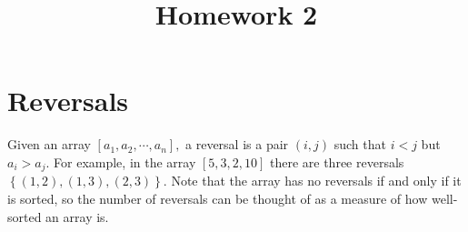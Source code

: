 \documentclass{article}
\begin{document}
\title{Homework 2}
\maketitle
\thispagestyle{fancy}

\section{Reversals}

Given an array $[a_1, a_2, \cdots, a_n],$ a reversal is a pair $(i, j)$ such that $i<j$ but $a_i>a_j.$ For example, in the array $[5, 3, 2, 10]$ there are three reversals $\left\{ (1, 2), (1, 3), (2, 3) \right\}.$ Note that the array has no reversals if and only if it is sorted, so the number of reversals can be thought of as a measure of how well-sorted an array is.
\end{document}
